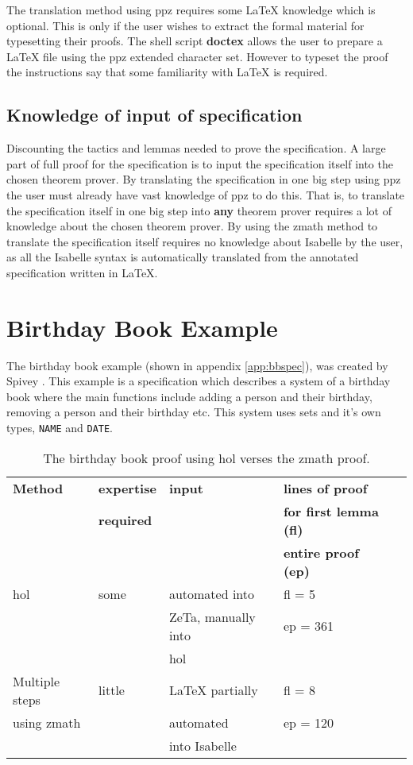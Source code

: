 The translation method using \gls{ppz} requires some \LaTeX{} knowledge which is optional. This is only if the user wishes to extract the formal material for typesetting their proofs. The shell script \textbf{doctex} allows the user to prepare a \LaTeX{} file using the \gls{ppz} extended character set. However to typeset the proof the instructions say that some familiarity with \LaTeX{} is required.

\subsection{Knowledge of input of specification}
Discounting the tactics and lemmas needed to prove the specification. A large part of full proof for the specification is to input the specification itself into the chosen theorem prover. By translating the specification in one big step using \gls{ppz} the user must already have vast knowledge of \gls{ppz} to do this. That is, to translate the specification itself in one big step into \textbf{any} theorem prover requires a lot of knowledge about the chosen theorem prover. By using the \gls{zmath} method to translate the specification itself requires no knowledge about Isabelle by the user, as all the Isabelle syntax is automatically translated from the annotated specification written in \LaTeX{}. 

\section{Birthday Book Example}

The birthday book example (shown in appendix \ref{app:bbspec}), was created by Spivey \cite{spiveyreferencemanual}. This example is a specification which describes a system of a birthday book where the main functions include adding a person and their birthday, removing a person and their birthday etc. This system uses sets and it's own types, \texttt{NAME} and \texttt{DATE}.

\begin{table}[H]
\begin{center}
\begin{tabular}{| l || l | l | l | l |}
\hline
\textbf{Method} & \textbf{expertise} &  \textbf{input} & \textbf{lines of proof}  \\
& \textbf{required} & & \textbf{for first lemma (fl)}  \\
& & & \textbf{entire proof (ep)} \\
\hline
 \gls{hol} & some  & automated into  & fl = 5  \\
 & & ZeTa, manually into & ep = 361 \\
& & \gls{hol} & \\
\hline
 Multiple steps &  little & \LaTeX{} partially  & fl = 8  \\
using \gls{zmath} & & automated & ep = 120 \\
&  & into Isabelle &  \\
\hline
\end{tabular}
\end{center}
\caption{The birthday book proof using \gls{hol} verses the \gls{zmath} proof.}
\label{tab:comparebb}
\end{table}

